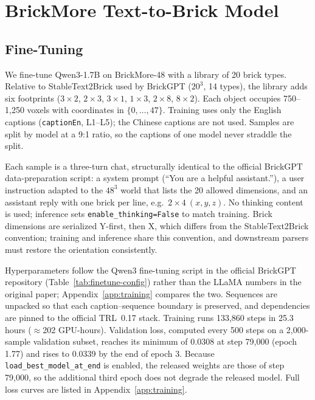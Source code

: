 \documentclass[letterpaper]{article} %
\begin{document}
\section{BrickMore Text-to-Brick Model}
\label{sec:model}
\subsection{Fine-Tuning}
\label{sec:training}
We fine-tune Qwen3-1.7B on BrickMore-48 with a library of 20 brick types. Relative to StableText2Brick used by BrickGPT ($20^3$, 14 types), the library adds six footprints ($3{\times}2$, $2{\times}3$, $3{\times}1$, $1{\times}3$, $2{\times}8$, $8{\times}2$). Each object occupies 750--1,250 voxels with coordinates in $\{0,\ldots,47\}$. Training uses only the English captions (\texttt{captionEn}, L1--L5); the Chinese captions are not used. Samples are split by model at a 9:1 ratio, so the captions of one model never straddle the split.

Each sample is a three-turn chat, structurally identical to the official BrickGPT data-preparation script: a system prompt (``You are a helpful assistant.''), a user instruction adapted to the $48^3$ world that lists the 20 allowed dimensions, and an assistant reply with one brick per line, e.g.\ $2{\times}4\ (x,y,z)$. No thinking content is used; inference sets \texttt{enable\_thinking=False} to match training. Brick dimensions are serialized Y-first, then X, which differs from the StableText2Brick convention; training and inference share this convention, and downstream parsers must restore the orientation consistently.

Hyperparameters follow the Qwen3 fine-tuning script in the official BrickGPT repository (Table~\ref{tab:finetune-config}) rather than the LLaMA numbers in the original paper; Appendix~\ref{app:training} compares the two. Sequences are unpacked so that each caption--sequence boundary is preserved, and dependencies are pinned to the official TRL~0.17 stack. Training runs 133,860 steps in 25.3 hours ($\approx$202 GPU-hours). Validation loss, computed every 500 steps on a 2,000-sample validation subset, reaches its minimum of 0.0308 at step 79,000 (epoch 1.77) and rises to 0.0339 by the end of epoch 3. Because \texttt{load\_best\_model\_at\_end} is enabled, the released weights are those of step 79,000, so the additional third epoch does not degrade the released model. Full loss curves are listed in Appendix~\ref{app:training}.
\end{document}
